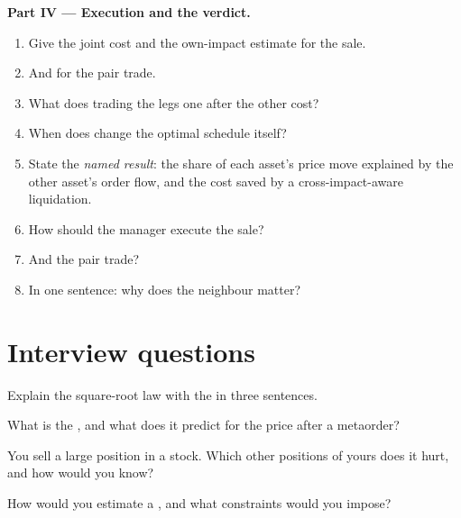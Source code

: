 \begin{problem}
\medskip\noindent\textbf{Part IV --- Execution and the verdict.}
\begin{enumerate}[resume]
\item Give the joint cost and the own-impact estimate for the sale.
\item And for the pair trade.
\item What does trading the legs one after the other cost?
\item When does  change the optimal schedule itself?
\item State the \emph{named result}: the share of each asset's price move explained by the other asset's order flow, and the cost saved by a
cross-impact-aware liquidation.
\item How should the manager execute the sale?
\item And the pair trade?
\item In one sentence: why does the neighbour matter?
\end{enumerate}
\end{problem}

\section{Interview questions}

\begin{interviewq}\label{iq:mx:metaorders-latent-liquidity-and-cross-impact:1}
Explain the square-root law with the  in three sentences.
\end{interviewq}

\begin{interviewq}\label{iq:mx:metaorders-latent-liquidity-and-cross-impact:2}
What is the , and what does it predict for the price after a metaorder?
\end{interviewq}

\begin{interviewq}\label{iq:mx:metaorders-latent-liquidity-and-cross-impact:3}
You sell a large position in a stock. Which other positions of yours does it hurt, and how would you know?
\end{interviewq}

\begin{interviewq}\label{iq:mx:metaorders-latent-liquidity-and-cross-impact:4}
How would you estimate a , and what constraints would you impose?
\end{interviewq}

